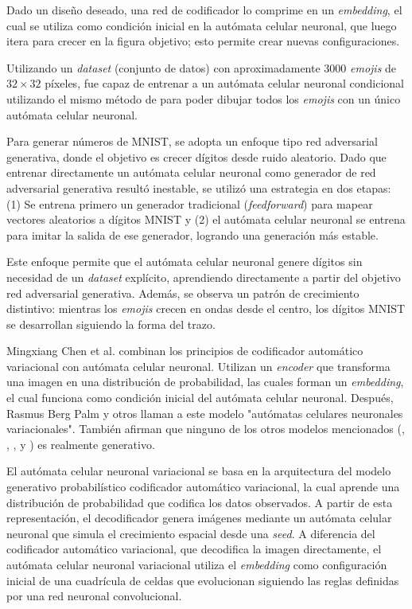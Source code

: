 Dado un diseño deseado, una red de codificador lo comprime en un \textit{embedding}, el cual se utiliza como condición inicial en la autómata celular neuronal, que luego itera para crecer en la figura objetivo; esto permite crear nuevas configuraciones.

Utilizando un \textit{dataset} (conjunto de datos) con aproximadamente 3000 \textit{emojis} de $32 \times 32$ píxeles, fue capaz de entrenar a un autómata celular neuronal condicional utilizando el mismo método de \cite{mordvintsevNCA} para poder dibujar todos los \textit{emojis} con un único autómata celular neuronal.

Para generar números de MNIST, se adopta un enfoque tipo red adversarial generativa, donde el objetivo es crecer dígitos desde ruido aleatorio. Dado que entrenar directamente un autómata celular neuronal como generador de red adversarial generativa resultó inestable, se utilizó una estrategia en dos etapas: (1) Se entrena primero un generador tradicional (\textit{feedforward}) para mapear vectores aleatorios a dígitos MNIST y (2) el autómata celular neuronal se entrena para imitar la salida de ese generador, logrando una generación más estable.

Este enfoque permite que el autómata celular neuronal genere dígitos sin necesidad de un \textit{dataset} explícito, aprendiendo directamente a partir del objetivo red adversarial generativa. Además, se observa un patrón de crecimiento distintivo: mientras los \textit{emojis} crecen en ondas desde el centro, los dígitos MNIST se desarrollan siguiendo la forma del trazo.

Mingxiang Chen et al. \cite{VAENCA} combinan los principios de codificador automático variacional con autómata celular neuronal. Utilizan un \textit{encoder} que transforma una imagen en una distribución de probabilidad, las cuales forman un \textit{embedding}, el cual funciona como condición inicial del autómata celular neuronal. Después, Rasmus Berg Palm y otros \cite{VNCA} llaman a este modelo "autómatas celulares neuronales variacionales". También afirman que ninguno de los otros modelos mencionados (\cite{mordvintsevNCA}, \cite{NCAM}, \cite{GCA}, \cite{horibe} y \cite{StampCA}) es realmente generativo.

El autómata celular neuronal variacional se basa en la arquitectura del modelo generativo probabilístico codificador automático variacional, la cual aprende una distribución de probabilidad que codifica los datos observados. A partir de esta representación, el decodificador genera imágenes mediante un autómata celular neuronal que simula el crecimiento espacial desde una \textit{seed}. A diferencia del codificador automático variacional, que decodifica la imagen directamente, el autómata celular neuronal variacional utiliza el \textit{embedding} como configuración inicial de una cuadrícula de celdas que evolucionan siguiendo las reglas definidas por una red neuronal convolucional. 


